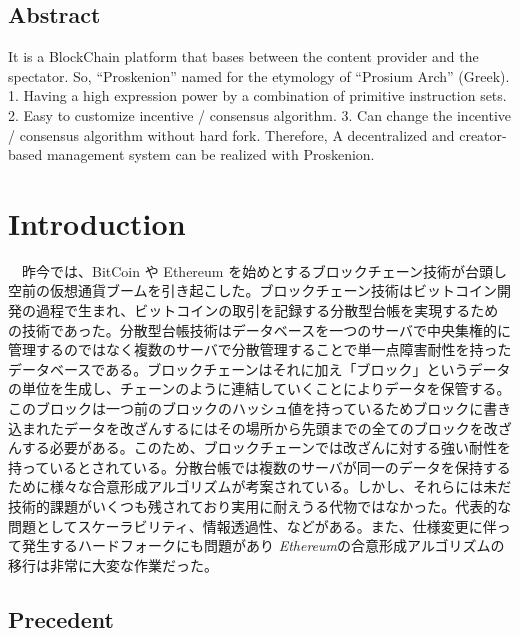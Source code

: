\hypertarget{abstract}{%
\subsection{Abstract}\label{abstract}}

It is a BlockChain platform that bases between the content provider and
the spectator. So, ``Proskenion'' named for the etymology of ``Prosium
Arch'' (Greek). 1. Having a high expression power by a combination of
primitive instruction sets. 2. Easy to customize incentive / consensus
algorithm. 3. Can change the incentive / consensus algorithm without
hard fork. Therefore, A decentralized and creator-based management
system can be realized with Proskenion.

\hypertarget{introduction}{%
\section{Introduction}\label{introduction}}

　昨今では、BitCoin\cite{1} や Ethereum\cite{2}
を始めとするブロックチェーン技術が台頭し空前の仮想通貨ブームを引き起こした。ブロックチェーン技術はビットコイン開発の過程で生まれ、ビットコインの取引を記録する分散型台帳を実現するための技術であった。分散型台帳技術はデータベースを一つのサーバで中央集権的に管理するのではなく複数のサーバで分散管理することで単一点障害耐性を持ったデータベースである。ブロックチェーンはそれに加え「ブロック」というデータの単位を生成し、チェーンのように連結していくことによりデータを保管する。このブロックは一つ前のブロックのハッシュ値を持っているためブロックに書き込まれたデータを改ざんするにはその場所から先頭までの全てのブロックを改ざんする必要がある。このため、ブロックチェーンでは改ざんに対する強い耐性を持っているとされている。分散台帳では複数のサーバが同一のデータを保持するために様々な合意形成アルゴリズムが考案されている。しかし、それらには未だ技術的課題がいくつも残されており実用に耐えうる代物ではなかった。代表的な問題としてスケーラビリティ、情報透過性、などがある。また、仕様変更に伴って発生するハードフォークにも問題があり
\emph{Ethereum}の合意形成アルゴリズムの移行は非常に大変な作業だった。

\hypertarget{precedent}{%
\subsection{Precedent}\label{precedent}}

